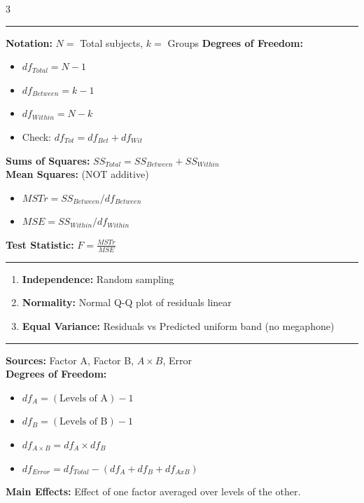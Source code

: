 \documentclass[7pt, letterpaper]{article}
\newcommand{\sectionhead}[1]{%
    \vspace{0.5mm}{\normalsize\bfseries#1}\vspace{0mm}\hrule\vspace{0.5mm}%
}
\begin{document}
\begin{multicols}{3}
\sectionhead{One-Way ANOVA}
\textbf{Notation:} $N=$ Total subjects, $k=$ Groups
\textbf{Degrees of Freedom:}
\begin{itemize}
    \item $df_{Total} = N - 1$
    \item $df_{Between} = k - 1$
    \item $df_{Within} = N - k$
    \item Check: $df_{Tot} = df_{Bet} + df_{Wit}$
\end{itemize}
\textbf{Sums of Squares:} $SS_{Total} = SS_{Between} + SS_{Within}$ \\
\textbf{Mean Squares:} (NOT additive)
\begin{itemize}
    \item $MSTr = SS_{Between} / df_{Between}$
    \item $MSE = SS_{Within} / df_{Within}$
\end{itemize}
\textbf{Test Statistic:} $F = \frac{MSTr}{MSE}$

\sectionhead{Assumptions}
\begin{enumerate}
    \item \textbf{Independence:} Random sampling
    \item \textbf{Normality:} Normal Q-Q plot of residuals linear
    \item \textbf{Equal Variance:} Residuals vs Predicted uniform band (no megaphone)
\end{enumerate}

\columnbreak

\sectionhead{Two-Way ANOVA}
\textbf{Sources:} Factor A, Factor B, $A \times B$, Error \\
\textbf{Degrees of Freedom:}
\begin{itemize}
    \item $df_A = (\text{Levels of A}) - 1$
    \item $df_B = (\text{Levels of B}) - 1$
    \item $df_{A \times B} = df_A \times df_B$
    \item $df_{Error} = df_{Total} - (df_A + df_B + df_{AxB})$
\end{itemize}
\textbf{Main Effects:} Effect of one factor averaged over levels of the other.


\end{multicols}
\end{document}
